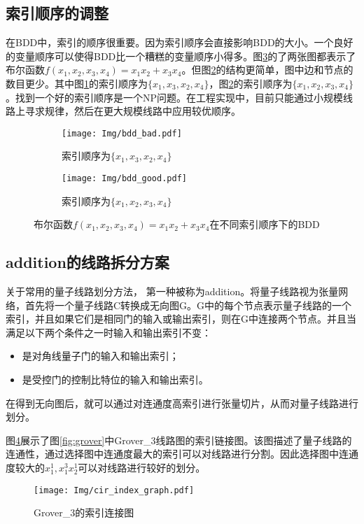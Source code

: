 \subsection*{索引顺序的调整}
\label{contraction}在BDD中，索引的顺序很重要。因为索引顺序会直接影响BDD的大小。一个良好的变量顺序可以使得BDD比一个糟糕的变量顺序小得多。图\ref{fig:bdd-compare}的了两张图都表示了布尔函数$f (x_1,x_2,x_3,x_4)=x_1x_2+x_3x_4$。但图\ref{fig:bdd-good}的结构更简单，图中边和节点的数目更少。其中图\ref{fig:bdd-bad}的索引顺序为$\{x_1,x_3,x_2,x_4\}$，图\ref{fig:bdd-good}的索引顺序为$\{x_1,x_2,x_3,x_4\}$。找到一个好的索引顺序是一个NP问题。在工程实现中，目前只能通过小规模线路上寻求规律，然后在更大规模线路中应用较优顺序。
\begin{figure}[!htbp]
	\centering
	\begin{subfigure}[b]{.4\textwidth}
        \centering
        \texttt{[image: Img/bdd\_bad.pdf]}
		\caption{索引顺序为$\{x_1,x_3,x_2,x_4\}$}
		\label{fig:bdd-bad}
	\end{subfigure}
	\begin{subfigure}[b]{.4\textwidth}
        \centering
        \texttt{[image: Img/bdd\_good.pdf]}
		\caption{索引顺序为$\{x_1,x_2,x_3,x_4\}$}
		\label{fig:bdd-good}
	\end{subfigure}
	\caption{布尔函数$f (x_1,x_2,x_3,x_4)=x_1x_2+x_3x_4$在不同索引顺序下的BDD}
	\label{fig:bdd-compare}
\end{figure}

\subsection*{addition的线路拆分方案}
\label{addition}关于常用的量子线路划分方法，
第一种被称为addition\citep{chen2018classical}。将量子线路视为张量网络，首先将一个量子线路C转换成无向图G。G中的每个节点表示量子线路的一个索引，并且如果它们是相同门的输入或输出索引，则在G中连接两个节点。并且当满足以下两个条件之一时输入和输出索引不变：
\begin{itemize}
	\item 是对角线量子门的输入和输出索引；
	\item 是受控门的控制比特位的输入和输出索引。
\end{itemize}
在得到无向图后，就可以通过对连通度高索引进行张量切片，从而对量子线路进行划分。 
\begin{example}
    图\ref{fig:addition}展示了图\ref{fig:grover}中Grover\_3线路图的索引链接图。该图描述了量子线路的连通性，通过选择图中连通度最大的索引可以对线路进行分割。因此选择图中连通度较大的$x_1^1,x_1^3x_2^1$可以对线路进行较好的划分。
 
\begin{figure}[!htbp]
	\centering
	\texttt{[image: Img/cir\_index\_graph.pdf]}
	\caption{Grover\_3的索引连接图}
	\label{fig:addition}
\end{figure} 
\end{example}

